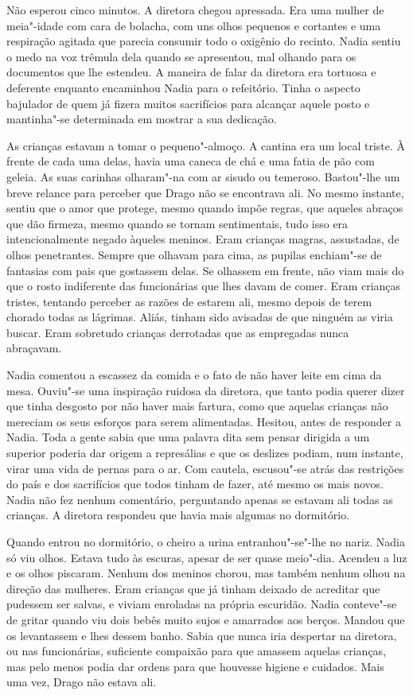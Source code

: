 Não esperou cinco minutos. A diretora chegou apressada. Era uma
mulher de meia"-idade com cara de bolacha, com uns olhos pequenos e
cortantes e uma respiração agitada que parecia consumir todo o oxigênio
do recinto. Nadia sentiu o medo na voz trêmula dela quando se apresentou, mal olhando para os documentos que lhe estendeu. A maneira de
falar da diretora era tortuosa e deferente enquanto encaminhou Nadia
para o refeitório. Tinha o aspecto bajulador de quem já fizera muitos
sacrifícios para alcançar aquele posto e mantinha"-se determinada em mostrar a sua dedicação.

As crianças estavam a tomar o pequeno"-almoço. A cantina era um local
triste. À frente de cada uma delas, havia uma caneca de chá e uma fatia
de pão com geleia. As suas carinhas olharam"-na com ar sisudo ou
temeroso. Bastou"-lhe um breve relance para perceber que Drago não se encontrava ali. No
mesmo instante, sentiu que o amor que protege, mesmo quando impõe
regras, que aqueles abraços que dão firmeza, mesmo quando se tornam
sentimentais, tudo isso era intencionalmente negado àqueles meninos.
Eram crianças magras, assustadas, de olhos penetrantes. Sempre que
olhavam para cima, as pupilas enchiam"-se de fantasias com pais que
gostassem delas. Se olhassem em frente, não viam mais do que o rosto
indiferente das funcionárias que lhes davam de comer. Eram crianças
tristes, tentando perceber as razões de estarem ali, mesmo depois de
terem chorado todas as lágrimas. Aliás, tinham sido avisadas de que
ninguém as viria buscar. Eram sobretudo crianças derrotadas que as
empregadas nunca abraçavam.

Nadia comentou a escassez da comida e o fato de não haver leite em cima
da mesa. Ouviu"-se uma inspiração ruidosa da diretora, que tanto podia
querer dizer que tinha desgosto por não haver mais fartura, como que
aquelas crianças não mereciam os seus esforços para serem alimentadas.
Hesitou, antes de responder a Nadia. Toda a gente sabia que uma palavra
dita sem pensar dirigida a um superior poderia dar origem a represálias
e que os deslizes podiam, num instante, virar uma vida de pernas para o
ar. Com cautela, escusou"-se atrás das restrições do país e dos
sacrifícios que todos tinham de fazer, até mesmo os mais novos. Nadia
não fez nenhum comentário, perguntando apenas se estavam ali todas as
crianças. A diretora respondeu que havia mais algumas no dormitório.

Quando entrou no dormitório, o cheiro a urina entranhou"-se"-lhe no nariz. Nadia só viu olhos. Estava tudo às escuras,
apesar de ser quase meio"-dia. Acendeu a luz e os olhos piscaram. Nenhum
dos meninos chorou, mas também nenhum olhou na direção das mulheres.
Eram crianças que já tinham deixado de acreditar que pudessem ser
salvas, e viviam enroladas na própria escuridão. Nadia conteve"-se de
gritar quando viu dois bebês muito sujos e amarrados aos berços. Mandou
que os levantassem e lhes dessem banho. Sabia que nunca iria despertar
na diretora, ou nas funcionárias, suficiente compaixão para que amassem aquelas crianças, mas pelo menos podia dar ordens para que houvesse
higiene e cuidados. Mais uma vez, Drago não estava ali.

